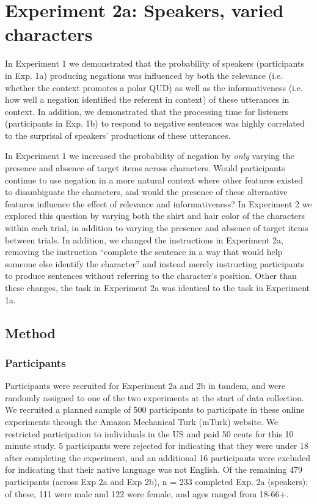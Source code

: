 \documentclass[man, floatsintext, noapacite]{apa6}
\begin{document}
\section{Experiment 2a: Speakers, varied characters}

In Experiment 1 we demonstrated that the probability of speakers (participants in Exp. 1a) producing negations was influenced by both the relevance (i.e. whether the context promotes a polar QUD) as well as the informativeness (i.e. how well a negation identified the referent in context) of these utterances in context. In addition, we demonstrated that the processing time for listeners (participants in Exp. 1b) to respond to negative sentences was highly correlated to the surprisal of speakers' productions of these utterances. 

In Experiment 1 we increased the probability of negation by \textit{only} varying the presence and absence of target items across characters. Would participants continue to use negation in a more natural context where other features existed to disambiguate the characters, and would the presence of these alternative features influence the effect of relevance and informativeness? In Experiment 2 we explored this question by varying both the shirt and hair color of the characters within each trial, in addition to varying the presence and absence of target items between trials. In addition, we changed the instructions in Experiment 2a, removing the instruction ``complete the sentence in a way that would help someone else identify the character'' and instead merely instructing participants to produce sentences without referring to the character's position. Other than these changes, the task in Experiment 2a was identical to the task in Experiment 1a. 

\subsection{Method}

\subsubsection{Participants} 

Participants were recruited for Experiment 2a and 2b in tandem, and were randomly assigned to one of the two experiments at the start of data collection. We recruited a planned sample of 500 participants to participate in these online experiments through the Amazon Mechanical Turk (mTurk) website. We restricted participation to individuals in the US and paid 50 cents for this 10 minute study. 5 participants were rejected for indicating that they were under 18 after completing the experiment, and an additional 16 participants were excluded for indicating that their native language was not English. Of the remaining 479 participants (across Exp 2a and Exp 2b), n = 233 completed Exp. 2a (speakers); of these, 111 were male and 122 were female, and ages ranged from 18-66+. 
\end{document}
